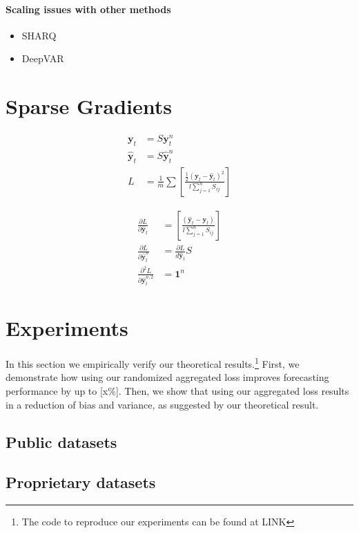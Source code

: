 \documentclass{article}
\begin{document}
\paragraph{Scaling issues with other methods}
\begin{itemize}
  \item SHARQ
  \item DeepVAR
\end{itemize}

\section{Sparse Gradients}
\begin{align}
  \textbf{y}_{t} &= S  \textbf{y}^n_{t} \nonumber \\
  \hat{\textbf{y}}_{t} &= S \hat{\textbf{y}}^n_{t} \nonumber \\
  L &= \frac{1}{m} \sum \left[ \frac{\frac{1}{2}(\textbf{y}_{t} - \hat{\textbf{y}}_{t})^2}{l \sum_{j=1}^n S_{ij}} \right]
\end{align}

\begin{align}
  \frac{\partial L}{\partial \hat{\textbf{y}}_{t}} &=  \left[ \frac{(\hat{\textbf{y}}_{t} - \textbf{y}_{t})}{l \sum_{j=1}^n S_{ij}} \right] \\
  \frac{\partial L}{\partial \hat{\textbf{y}}^n_{t}} &= \frac{\partial L}{d \hat{\textbf{y}}_{t}} S \\
  \frac{\partial^2 L}{\partial \hat{\textbf{y}}_{t}^{n, 2}} &= \mathbf{1}^n
\end{align}

\section{Experiments}
  \label{sec:experiments}
  In this section we empirically verify our theoretical results.\footnote{The code to reproduce our experiments can be found at LINK} First, we demonstrate how using our randomized aggregated loss improves forecasting performance by up to [x\%]. Then, we show that using our aggregated loss results in a reduction of bias and variance, as suggested by our theoretical result.

  \subsection{Public datasets}
    \label{subsec:publicdatasets}

  \subsection{Proprietary datasets}
    \label{subsec:proprietarydatasets}
\end{document}
